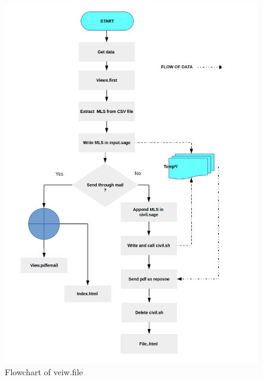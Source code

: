 \begin{figure}[H]
\centering \includegraphics[scale=0.27]{images/flowchartfile.png}
\caption{Flowchart of veiw.file}
\end{figure}
